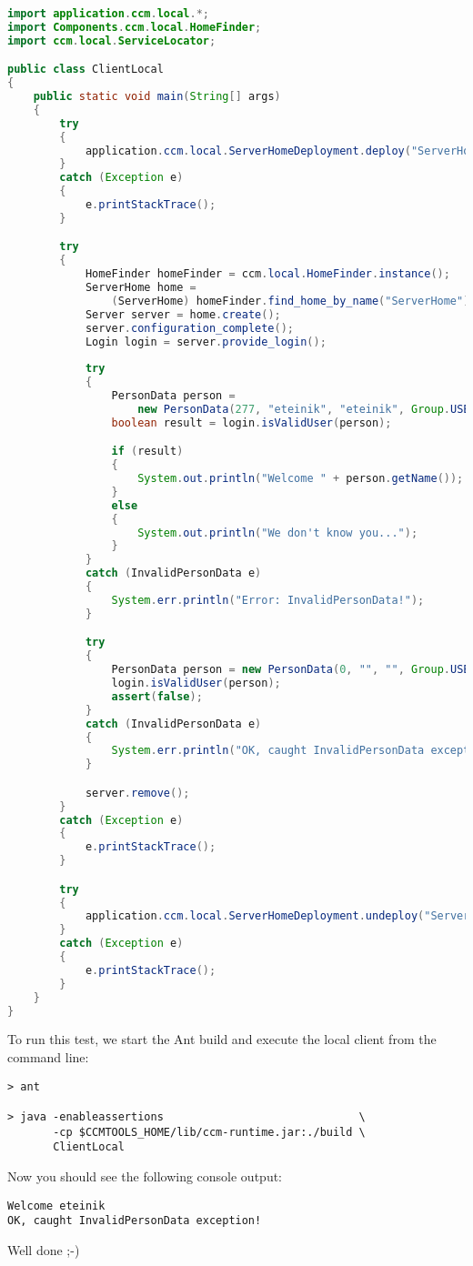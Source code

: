 \begin{footnotesize}
\begin{lstlisting}[language=Java]
import application.ccm.local.*;
import Components.ccm.local.HomeFinder;
import ccm.local.ServiceLocator;

public class ClientLocal
{
    public static void main(String[] args)
    {
        try
        {
            application.ccm.local.ServerHomeDeployment.deploy("ServerHome");
        }
        catch (Exception e)
        {
            e.printStackTrace();
        }

        try
        {            
            HomeFinder homeFinder = ccm.local.HomeFinder.instance();
            ServerHome home = 
                (ServerHome) homeFinder.find_home_by_name("ServerHome");
            Server server = home.create();
            server.configuration_complete();
            Login login = server.provide_login();
                        
            try
            {
                PersonData person = 
                    new PersonData(277, "eteinik", "eteinik", Group.USER);
                boolean result = login.isValidUser(person);

                if (result)
                {
                    System.out.println("Welcome " + person.getName());
                }
                else
                {
                    System.out.println("We don't know you...");
                }
            }
            catch (InvalidPersonData e)
            {
                System.err.println("Error: InvalidPersonData!");
            }

            try
            {
                PersonData person = new PersonData(0, "", "", Group.USER);
                login.isValidUser(person);
                assert(false);
            }
            catch (InvalidPersonData e)
            {
                System.err.println("OK, caught InvalidPersonData exception!");
            }

            server.remove();
        }
        catch (Exception e)
        {
            e.printStackTrace();
        }

        try
        {
            application.ccm.local.ServerHomeDeployment.undeploy("ServerHome");
        }
        catch (Exception e)
        {
            e.printStackTrace();
        }
    }
}
\end{lstlisting}
\end{footnotesize}

To run this test, we start the Ant build and execute the local client
from the command line:

\begin{verbatim}
> ant

> java -enableassertions                              \
       -cp $CCMTOOLS_HOME/lib/ccm-runtime.jar:./build \
       ClientLocal
\end{verbatim}

Now you should see the following console output:
\begin{verbatim}
Welcome eteinik
OK, caught InvalidPersonData exception!
\end{verbatim}

Well done ;-)

\newpage